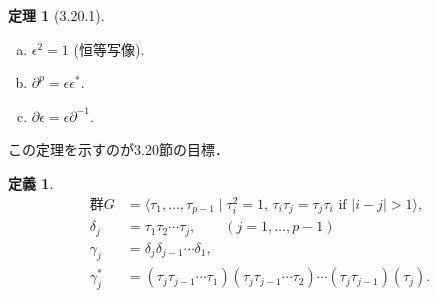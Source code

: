 \documentclass[xelatex,ja=standard,a4paper,14pt,everyparhook=compat]{bxjsarticle}
\theoremstyle{definition}
\newtheorem*{theorem}{定理}
\newtheorem*{definition}{定義}
\begin{document}
\newpage

\begin{theorem}[3.20.1]
    \begin{enumerate}[(a)]
        \item $\epsilon^2 = 1$ (恒等写像).
        \item $\partial^p = \epsilon\epsilon^*$.
        \item $\partial\epsilon = \epsilon\partial^{-1}$.
    \end{enumerate}
\end{theorem}
この定理を示すのが3.20節の目標．

\begin{definition}
    \begin{align*}
        \text{群$G$} &= \langle \tau_1,\ldots,\tau_{p-1} \mid \text{$\tau_i^2 = 1$, $\tau_i \tau_j = \tau_j \tau_i$ if $|i-j| > 1$} \rangle, \\
        \delta_j &= \tau_1 \tau_2 \cdots \tau_j, \qquad (j=1,\ldots,p-1) \\
        \gamma_j &= \delta_j \delta_{j-1} \cdots \delta_1, \\
        \gamma^*_j &= (\tau_j \tau_{j-1} \cdots \tau_1)(\tau_j \tau_{j-1} \cdots \tau_2)\cdots(\tau_j \tau_{j-1}) (\tau_j).
    \end{align*}
\end{definition}
\end{document}
